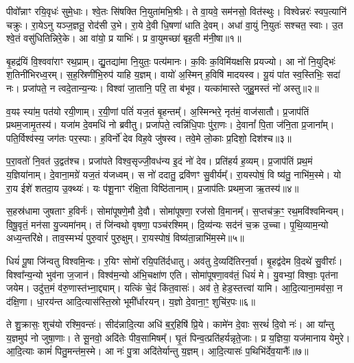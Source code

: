 पीवो᳚न्नाꣳ रयि॒वृधः॑ सुमे॒धाः।
श्वे॒तः सि॑षक्ति नि॒युता॑\-मभि॒श्रीः।
ते वा॒यवे॒ सम॑नसो॒ वित॑स्थुः।
विश्वेन्नरः॑ स्वप॒त्यानि॑ चक्रुः।
रा॒येऽनु यञ्ज॒ज्ञतू॒ रोद॑सी उ॒भे।
रा॒ये दे॒वी धि॒षणा॑ धाति दे॒वम्।
अधा॑ वा॒युं नि॒युतः॑ सश्चत॒ स्वाः।
उ॒त श्वे॒तं वसु॑धितिन्निरे॒के।
आ वा॑यो॒ प्र याभिः॑।
प्र वा॒युमच्छा॑ बृह॒ती म॑नी॒षा॥१॥\ip

बृ॒हद्र॑यिं वि॒श्ववा॑राꣳ रथ॒प्राम्।
द्यु॒तद्या॑मा नि॒युतः॒ पत्य॑मानः।
क॒विः क॒विमि॑यक्षसि प्रयज्यो।
आ नो॑ नि॒युद्भिः॑ श॒तिनी॑भिरध्व॒रम्।
स॒ह॒स्रिणी॑भि॒रुप॑ याहि य॒ज्ञम्।
वायो॑ अ॒स्मिन् ह॒विषि॑ मादयस्व।
यू॒यं पा॑त स्व॒स्तिभिः॒ सदा॑ नः।
प्रजा॑पते॒ न त्वदे॒तान्य॒न्यः।
विश्वा॑ जा॒तानि॒ परि॒ ता ब॑भूव।
यत्का॑मास्ते जुहु॒मस्तं नो॑ अस्तु॥२॥\ip

व॒यꣴ स्या॑म॒ पत॑यो रयी॒णाम्।
र॒यी॒णां पतिं॑ यज॒तं बृ॒हन्तम्᳚।
अ॒स्मिन्भरे॒ नृत॑मं॒ वाज॑सातौ।
प्र॒जा\-प॑तिं प्रथम॒जामृ॒तस्य॑।
यजा॑म दे॒वमधि॑ नो ब्रवीतु।
प्रजा॑पते॒ त्वन्नि॑धि॒पाः पु॑रा॒णः।
दे॒वानां᳚ पि॒ता ज॑नि॒ता प्र॒जाना᳚म्।
पति॒र्विश्व॑स्य॒ जग॑तः पर॒स्पाः।
ह॒विर्नो॑ देव विह॒वे जु॑षस्व।
तवे॒मे लो॒काः प्र॒दिशो॒ दिश॑श्च॥३॥\ip

प॒रा॒वतो॑ नि॒वत॑ उ॒द्वत॑श्च।
प्रजा॑पते विश्व॒सृज्जी॒वध॑न्य इ॒दं नो॑ देव।
प्रति॑\-हर्य ह॒व्यम्।
प्र॒जा\-प॑तिं प्रथ॒मं य॒ज्ञिया॑नाम्।
दे॒वाना॒मग्रे॑ यज॒तं य॑जध्वम्।
स नो॑ ददातु॒ द्रवि॑णꣳ सु॒वीर्यम्᳚।
रा॒यस्पोषं॒ वि ष्य॑तु॒ नाभि॑म॒स्मे।
यो रा॒य ईशे॑ शतदा॒य उ॒क्थ्यः॑।
यः प॑शू॒नाꣳ र॑क्षि॒ता विष्ठि॑तानाम्।
प्र॒जा\-प॑तिः प्रथम॒जा ऋ॒तस्य॑॥४॥\ip

स॒हस्र॑धामा जुषताꣳ ह॒विर्नः॑।
सोमा॑पूषणे॒मौ दे॒वौ।
सोमा॑पूषणा॒ रज॑सो वि॒मानम्᳚।
स॒प्तच॑क्र॒ꣳ॒ रथ॒मवि॑श्वमिन्वम्।
वि॒षू॒वृतं॒ मन॑सा यु॒ज्यमा॑नम्।
तं जि॑न्वथो वृषणा॒ पञ्च॑रश्मिम्।
दि॒व्य॑न्यः सद॑नं च॒क्र उ॒च्चा।
पृ॒थि॒व्याम॒न्यो अध्य॒न्तरि॑क्षे।
ताव॒स्मभ्यं॑ पुरु॒वारं॑ पुरु॒क्षुम्।
रा॒यस्पोषं॒ विष्य॑ता॒न्नाभि॑म॒स्मे॥५॥\ip

धियं॑ पू॒षा जि॑न्वतु विश्वमि॒न्वः।
र॒यिꣳ सोमो॑ रयि॒पति॑र्दधातु।
अव॑तु दे॒व्यदि॑तिरन॒र्वा।
बृ॒हद्व॑देम वि॒दथे॑ सु॒वीराः᳚।
विश्वा᳚न्य॒न्यो भुव॑ना ज॒जान॑।
विश्व॑म॒न्यो अ॑भि॒चक्षा॑ण एति।
सोमा॑पूषणा॒वव॑तं॒ धियं॑ मे।
यु॒वभ्यां॒ विश्वाः॒ पृत॑ना जयेम।
उदु॑त्त॒मं व॑रु॒णास्त॑भ्ना॒द्द्याम्।
यत्किं चे॒दं कि॑त॒वासः॑।
अव॑ ते॒ हेड॒स्तत्त्वा॑ यामि।
आ॒दि॒त्याना॒मव॑सा॒ न द॑क्षि॒णा।
धा॒रय॑न्त आदि॒त्यास॑स्ति॒स्रो भूमी᳚र्धारयन्।
य॒ज्ञो दे॒वाना॒ꣳ॒ शुचि॑र॒पः॥६॥\ip\anuvakamend[म॒नी॒षा\-ऽस्तु॑ च॒र्तस्या॒स्मे कि॑त॒वास॑श्च॒त्वारि॑ च]

ते शु॒क्रासः॒ शुच॑यो रश्मि॒वन्तः॑।
सीद॑न्नादि॒त्या अधि॑ ब॒र्॒हिषि॑ प्रि॒ये।
कामे॑न दे॒वाः स॒रथं॑ दि॒वो नः॑।
आ या᳚न्तु य॒ज्ञमुप॑ नो जुषा॒णाः।
ते सू॒नवो॒ अदि॑तेः पीव॒सामिषम्᳚।
घृ॒तं पिन्व॒त्प्रति॑\-हर्यन्नृते॒जाः।
प्र य॒ज्ञिया॒ यज॑मानाय येमुरे।
आ॒दि॒त्याः कामं॑ पितु॒मन्त॑म॒स्मे।
आ नः॑ पु॒त्रा अदि॑तेर्यान्तु य॒ज्ञम्।
आ॒दि॒त्यासः॑ प॒थिभि॑र्देव॒यानैः᳚॥७॥\ip

